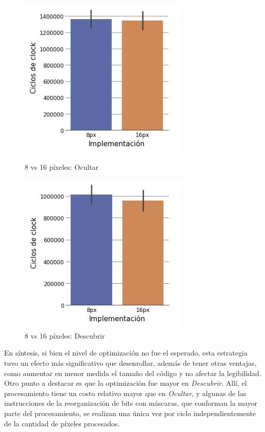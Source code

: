 \documentclass[a4paper]{article}
\begin{document}
\begin{figure}[!htb]
   \begin{minipage}{0.48\textwidth}
     \centering
     \includegraphics[width=.7\linewidth]{img/exp2ocultar.jpg}
     \caption{8 vs 16 píxeles: Ocultar}
   \end{minipage}\hfill
   \begin{minipage}{0.48\textwidth}
     \centering
     \includegraphics[width=.7\linewidth]{img/exp2descubrir.jpg}
     \caption{8 vs 16 píxeles: Descubrir}
   \end{minipage}
\end{figure}

En síntesis, si bien el nivel de optimización no fue el esperado, esta estrategia tuvo un efecto más significativo que desenrollar, además de tener otras ventajas, como aumentar en menor medida el tamaño del código y no afectar la legibilidad. Otro punto a destacar es que la optimización fue mayor en \textit{Descubrir}. Allí, el procesamiento tiene un costo relativo mayor que en \textit{Ocultar}, y algunas de las instrucciones de la reorganización de bits con máscaras, que conforman la mayor parte del procesamiento, se realizan una única vez por ciclo independientemente de la cantidad de píxeles procesados.
\end{document}
